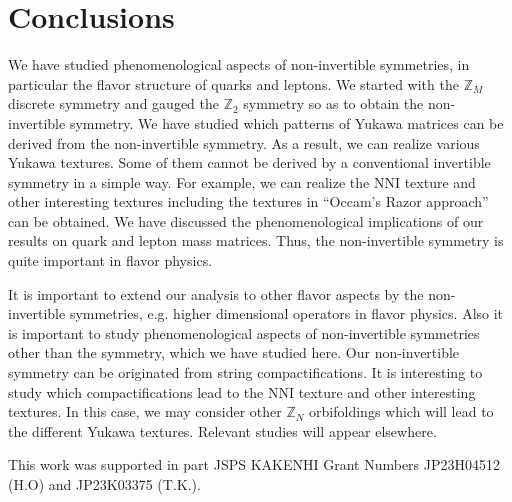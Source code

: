 \documentclass[a4paper,11pt]{article}
\numberwithin{equation}{section}
\begin{document}
\section{Conclusions}
\label{sec:con}

We have studied phenomenological aspects of non-invertible symmetries, in particular the flavor structure
of quarks and leptons.
We started with the $\mathbb{Z}_M$ discrete symmetry and gauged the $\mathbb{Z}_2$ symmetry so as to obtain the non-invertible symmetry.
We have studied which patterns of Yukawa matrices can be derived from the non-invertible symmetry.
As a result, we can realize various Yukawa textures.
Some of them cannot be derived by a conventional invertible symmetry in a simple way.
For example, we can realize the NNI texture and other interesting textures including the textures in ``Occam's Razor approach'' \cite{Harigaya:2012bw} can be obtained. 
We have discussed the phenomenological implications of our results on quark and lepton mass matrices. 
Thus, the non-invertible symmetry is quite important in flavor physics.


It is important to extend our analysis to other flavor aspects by the non-invertible symmetries, e.g. higher dimensional operators in flavor physics.
Also it is important to study phenomenological aspects of non-invertible symmetries other than the symmetry, which we have studied here.
Our non-invertible symmetry can be originated from string compactifications.
It is interesting to study which compactifications lead to the NNI texture and other interesting textures. 
In this case, we may consider other $\mathbb{Z}_N$ orbifoldings which will lead to the different Yukawa textures. 
Relevant studies will appear elsewhere.







\acknowledgments



This work was supported in part JSPS KAKENHI Grant Numbers JP23H04512 (H.O) and JP23K03375 (T.K.).





\appendix




{}
 


%
\end{document}

